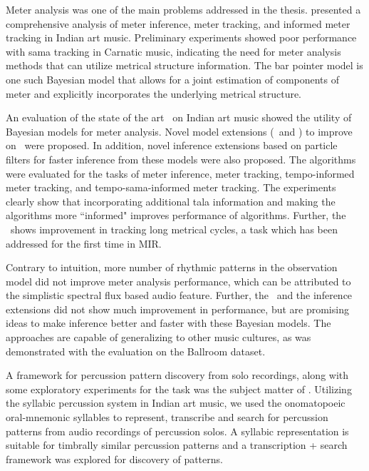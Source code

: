 Meter analysis was one of the main problems addressed in the thesis.  presented a comprehensive analysis of meter inference, meter tracking, and informed meter tracking in Indian art music. Preliminary experiments showed poor performance with \gls{sama} tracking in Carnatic music, indicating the need for meter analysis methods that can utilize metrical structure information. The bar pointer model is one such Bayesian model that allows for a joint estimation of components of meter and explicitly incorporates the underlying metrical structure. 

An evaluation of the state of the art \bpmodel\ on Indian art music showed the utility of Bayesian models for meter analysis. Novel model extensions (\momodel\ and \spmodel) to improve on \bpmodel\ were proposed. In addition, novel inference extensions based on particle filters for faster inference from these models were also proposed. The algorithms were evaluated for the tasks of meter inference, meter tracking, tempo-informed meter tracking, and tempo-sama-informed meter tracking. The experiments clearly show that incorporating additional \gls{tala} information and making the algorithms more ``informed" improves performance of algorithms. Further, the \spmodel\ shows improvement in tracking long metrical cycles, a task which has been addressed for the first time in \gls{MIR}. 

Contrary to intuition, more number of rhythmic patterns in the observation model did not improve meter analysis performance, which can be attributed to the simplistic spectral flux based audio feature. Further, the \momodel\ and the inference extensions did not show much improvement in performance, but are promising ideas to make inference better and faster with these Bayesian models. The approaches are capable of generalizing to other music cultures, as was demonstrated with the evaluation on the Ballroom dataset. 

A framework for percussion pattern discovery from solo recordings, along with some exploratory experiments for the task was the subject matter of . Utilizing the syllabic percussion system in Indian art music, we used the onomatopoeic oral-mnemonic syllables to represent, transcribe and search for percussion patterns from audio recordings of percussion solos. A syllabic representation is suitable for timbrally similar percussion patterns and a transcription + search framework was explored for discovery of patterns. 

